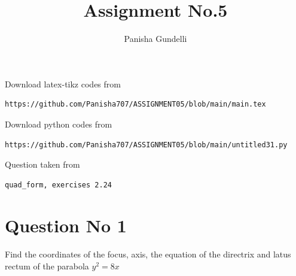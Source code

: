 \documentclass[journal,12pt,twocolumn]{IEEEtran}
\begin{document}
\makeatother
\let\StandardTheFigure\thefigure
\let\vec\mathbf
\renewcommand{\thefigure}{\theproblem}
\def\putbox#1#2#3{\makebox[0in][l]{\makebox[#1][l]{}\raisebox{\baselineskip}[0in][0in]{\raisebox{#2}[0in][0in]{#3}}}}
     \def\rightbox#1{\makebox[0in][r]{#1}}
     \def\centbox#1{\makebox[0in]{#1}}
     \def\topbox#1{\raisebox{-\baselineskip}[0in][0in]{#1}}
     \def\midbox#1{\raisebox{-0.5\baselineskip}[0in][0in]{#1}}
\vspace{3cm}
\title{Assignment No.5}
\author{Panisha Gundelli}
\maketitle
\newpage
\bigskip
\renewcommand{\thefigure}{\theenumi}
\renewcommand{\thetable}{\theenumi}
Download latex-tikz codes from
\begin{lstlisting}
https://github.com/Panisha707/ASSIGNMENT05/blob/main/main.tex
\end{lstlisting}
%
Download python codes from
\begin{lstlisting}
https://github.com/Panisha707/ASSIGNMENT05/blob/main/untitled31.py
\end{lstlisting}
%
Question taken from
\begin{lstlisting}
quad_form, exercises 2.24
\end{lstlisting}
\section{Question No 1}
Find the coordinates of the focus, axis, the equation of the directrix and latus rectum of the parabola $y^2 = 8x$
\end{document}
